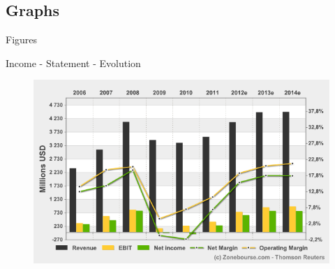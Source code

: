 \documentclass{beamer}
\begin{document}
\subsection{Graphs}
\begin{frame}{Figures}
	\begin{block}{Income - Statement - Evolution}
		\begin{figure}[h]
			\includegraphics[width=0.90\textheight]{./Income_Statement_Evolution.png}
		\end{figure}
	\end{block}	
\end{frame}
\end{document}
